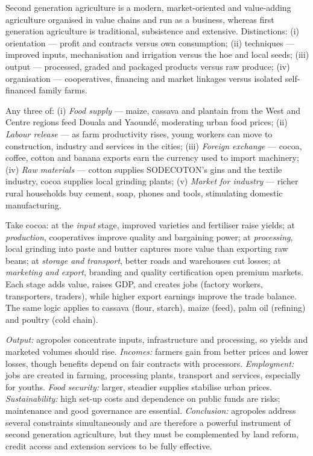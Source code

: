 \documentclass[11pt]{article}
\begin{document}
\begin{corrige}[Exercise 1]
Second generation agriculture is a modern, market-oriented and value-adding agriculture organised in value chains and run as a business, whereas first generation agriculture is traditional, subsistence and extensive. Distinctions: (i) orientation — profit and contracts versus own consumption; (ii) techniques — improved inputs, mechanisation and irrigation versus the hoe and local seeds; (iii) output — processed, graded and packaged products versus raw produce; (iv) organisation — cooperatives, financing and market linkages versus isolated self-financed family farms.
\end{corrige}

\begin{corrige}[Exercise 2]
Any three of: (i) \emph{Food supply} — maize, cassava and plantain from the West and Centre regions feed Douala and Yaoundé, moderating urban food prices; (ii) \emph{Labour release} — as farm productivity rises, young workers can move to construction, industry and services in the cities; (iii) \emph{Foreign exchange} — cocoa, coffee, cotton and banana exports earn the currency used to import machinery; (iv) \emph{Raw materials} — cotton supplies SODECOTON's gins and the textile industry, cocoa supplies local grinding plants; (v) \emph{Market for industry} — richer rural households buy cement, soap, phones and tools, stimulating domestic manufacturing.
\end{corrige}

\begin{corrige}[Exercise 3]
Take cocoa: at the \emph{input} stage, improved varieties and fertiliser raise yields; at \emph{production}, cooperatives improve quality and bargaining power; at \emph{processing}, local grinding into paste and butter captures more value than exporting raw beans; at \emph{storage and transport}, better roads and warehouses cut losses; at \emph{marketing and export}, branding and quality certification open premium markets. Each stage adds value, raises GDP, and creates jobs (factory workers, transporters, traders), while higher export earnings improve the trade balance. The same logic applies to cassava (flour, starch), maize (feed), palm oil (refining) and poultry (cold chain).
\end{corrige}

\begin{corrige}[Exercise 4]
\emph{Output:} agropoles concentrate inputs, infrastructure and processing, so yields and marketed volumes should rise. \emph{Incomes:} farmers gain from better prices and lower losses, though benefits depend on fair contracts with processors. \emph{Employment:} jobs are created in farming, processing plants, transport and services, especially for youths. \emph{Food security:} larger, steadier supplies stabilise urban prices. \emph{Sustainability:} high set-up costs and dependence on public funds are risks; maintenance and good governance are essential. \emph{Conclusion:} agropoles address several constraints simultaneously and are therefore a powerful instrument of second generation agriculture, but they must be complemented by land reform, credit access and extension services to be fully effective.
\end{corrige}
\end{document}
